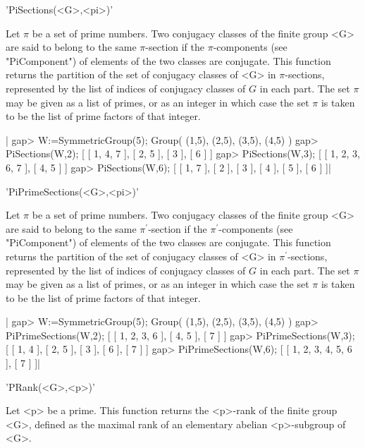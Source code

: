 'PiSections(<G>,<pi>)'

Let  $\pi$ be a set  of prime numbers. Two  conjugacy classes of the finite
group   <G>  are  said   to  belong  to   the  same  $\pi$-section  if  the
$\pi$-components  (see "PiComponent")  of elements  of the  two classes are
conjugate.  This function  returns the  partition of  the set  of conjugacy
classes  of <G>  in $\pi$-sections,  represented by  the list of indices of
conjugacy classes of $G$ in each part. The set $\pi$ may be given as a list
of  primes, or as an integer in which case the set $\pi$ is taken to be the
list of prime factors of that integer.

|    gap> W:=SymmetricGroup(5);
    Group( (1,5), (2,5), (3,5), (4,5) )
    gap> PiSections(W,2);
    [ [ 1, 4, 7 ], [ 2, 5 ], [ 3 ], [ 6 ] ]
    gap> PiSections(W,3);
    [ [ 1, 2, 3, 6, 7 ], [ 4, 5 ] ]
    gap> PiSections(W,6);
    [ [ 1, 7 ], [ 2 ], [ 3 ], [ 4 ], [ 5 ], [ 6 ] ]|

'PiPrimeSections(<G>,<pi>)'

Let  $\pi$ be a set  of prime numbers. Two  conjugacy classes of the finite
group  <G>  are  said  to  belong  to  the same $\pi^\prime$-section if the
$\pi^\prime$-components  (see "PiComponent") of elements of the two classes
are  conjugate. This function returns the partition of the set of conjugacy
classes of <G> in $\pi^\prime$-sections, represented by the list of indices
of  conjugacy classes of $G$ in each part.  The set $\pi$ may be given as a
list of primes, or as an integer in which case the set $\pi$ is taken to be
the list of prime factors of that integer.

|    gap> W:=SymmetricGroup(5);
    Group( (1,5), (2,5), (3,5), (4,5) )
    gap> PiPrimeSections(W,2);
    [ [ 1, 2, 3, 6 ], [ 4, 5 ], [ 7 ] ]
    gap> PiPrimeSections(W,3);
    [ [ 1, 4 ], [ 2, 5 ], [ 3 ], [ 6 ], [ 7 ] ]
    gap> PiPrimeSections(W,6);
    [ [ 1, 2, 3, 4, 5, 6 ], [ 7 ] ]|

'PRank(<G>,<p>)'

Let  <p> be a prime. This function returns the <p>-rank of the finite group
<G>,  defined as the maximal rank  of an elementary abelian <p>-subgroup of
<G>.

